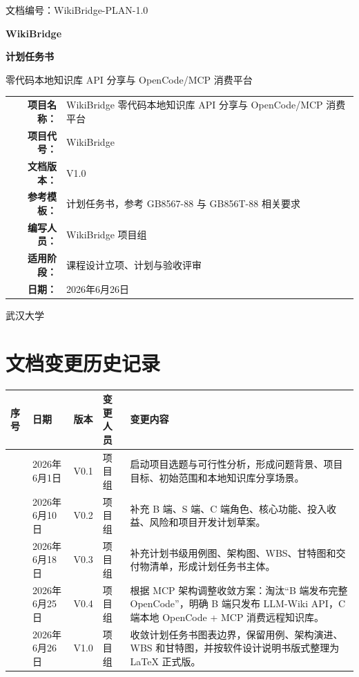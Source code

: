 \documentclass[UTF8,a4paper,12pt,fontset=fandol]{ctexart}
\newcommand{\docid}{WikiBridge-PLAN-1.0}
\newcommand{\docdate}{2026年6月26日}
\begin{document}
\begin{titlepage}
  \thispagestyle{empty}
  \begin{flushleft}
    \small 文档编号：\docid
  \end{flushleft}
  \vspace*{2.2cm}
  \begin{center}
    {\bfseries WikiBridge\par}
    \vspace{0.5cm}
    {\bfseries 计划任务书\par}
    \vspace{0.8cm}
    {\large 零代码本地知识库 API 分享与 OpenCode/MCP 消费平台\par}
    \vspace{2.4cm}
    \begin{tabular}{>{\bfseries}r l}
      项目名称： & WikiBridge 零代码本地知识库 API 分享与 OpenCode/MCP 消费平台 \\
      项目代号： & WikiBridge \\
      文档版本： & V1.0 \\
      参考模板： & 计划任务书，参考 GB8567-88 与 GB856T-88 相关要求 \\
      编写人员： & WikiBridge 项目组 \\
      适用阶段： & 课程设计立项、计划与验收评审 \\
      日期： & \docdate \\
    \end{tabular}
  \end{center}
  \vfill
  \begin{center}
    武汉大学
  \end{center}
\end{titlepage}

\section*{文档变更历史记录}
\begin{longtable}{>{\centering\arraybackslash}p{1.2cm}>{\centering\arraybackslash}p{2.8cm}>{\centering\arraybackslash}p{1.8cm}>{\centering\arraybackslash}p{2.2cm}p{6.2cm}}
\toprule
序号 & 日期 & 版本 & 变更人员 & 变更内容 \\
\midrule
1 & 2026年6月1日 & V0.1 & 项目组 & 启动项目选题与可行性分析，形成问题背景、项目目标、初始范围和本地知识库分享场景。 \\
2 & 2026年6月10日 & V0.2 & 项目组 & 补充 B 端、S 端、C 端角色、核心功能、投入收益、风险和项目开发计划草案。 \\
3 & 2026年6月18日 & V0.3 & 项目组 & 补充计划书级用例图、架构图、WBS、甘特图和交付物清单，形成计划任务书主体。 \\
4 & 2026年6月25日 & V0.4 & 项目组 & 根据 MCP 架构调整收敛方案：淘汰“B 端发布完整 OpenCode”，明确 B 端只发布 LLM-Wiki API，C 端本地 OpenCode + MCP 消费远程知识库。 \\
5 & 2026年6月26日 & V1.0 & 项目组 & 收敛计划任务书图表边界，保留用例、架构演进、WBS 和甘特图，并按软件设计说明书版式整理为 LaTeX 正式版。 \\
\bottomrule
\end{longtable}
\end{document}
